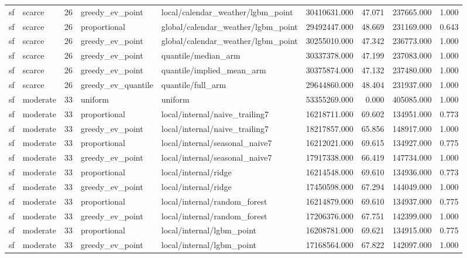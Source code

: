 \begin{tabular}{llrllrrrr}
sf & scarce & 26 & greedy\_ev\_point & local/calendar\_weather/lgbm\_point & 30410631.000 & 47.071 & 237665.000 & 1.000 \\
sf & scarce & 26 & proportional & global/calendar\_weather/lgbm\_point & 29492447.000 & 48.669 & 231169.000 & 0.643 \\
sf & scarce & 26 & greedy\_ev\_point & global/calendar\_weather/lgbm\_point & 30255010.000 & 47.342 & 236773.000 & 1.000 \\
sf & scarce & 26 & greedy\_ev\_point & quantile/median\_arm & 30337378.000 & 47.199 & 237083.000 & 1.000 \\
sf & scarce & 26 & greedy\_ev\_point & quantile/implied\_mean\_arm & 30375874.000 & 47.132 & 237480.000 & 1.000 \\
sf & scarce & 26 & greedy\_ev\_quantile & quantile/full\_arm & 29644860.000 & 48.404 & 231937.000 & 1.000 \\
sf & moderate & 33 & uniform & uniform & 53355269.000 & 0.000 & 405085.000 & 1.000 \\
sf & moderate & 33 & proportional & local/internal/naive\_trailing7 & 16218711.000 & 69.602 & 134951.000 & 0.773 \\
sf & moderate & 33 & greedy\_ev\_point & local/internal/naive\_trailing7 & 18217857.000 & 65.856 & 148917.000 & 1.000 \\
sf & moderate & 33 & proportional & local/internal/seasonal\_naive7 & 16212021.000 & 69.615 & 134927.000 & 0.775 \\
sf & moderate & 33 & greedy\_ev\_point & local/internal/seasonal\_naive7 & 17917338.000 & 66.419 & 147734.000 & 1.000 \\
sf & moderate & 33 & proportional & local/internal/ridge & 16214548.000 & 69.610 & 134936.000 & 0.773 \\
sf & moderate & 33 & greedy\_ev\_point & local/internal/ridge & 17450598.000 & 67.294 & 144049.000 & 1.000 \\
sf & moderate & 33 & proportional & local/internal/random\_forest & 16214879.000 & 69.610 & 134937.000 & 0.775 \\
sf & moderate & 33 & greedy\_ev\_point & local/internal/random\_forest & 17206376.000 & 67.751 & 142399.000 & 1.000 \\
sf & moderate & 33 & proportional & local/internal/lgbm\_point & 16208781.000 & 69.621 & 134915.000 & 0.775 \\
sf & moderate & 33 & greedy\_ev\_point & local/internal/lgbm\_point & 17168564.000 & 67.822 & 142097.000 & 1.000 \\

\end{tabular}
